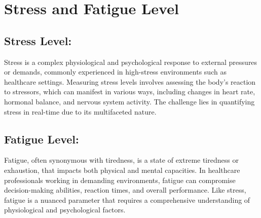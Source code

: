 \chapter{Stress and Fatigue Level}
\section{Stress Level:}
Stress is a complex physiological and psychological response to external pressures or demands, commonly experienced in high-stress environments such as healthcare settings. Measuring stress levels involves assessing the body's reaction to stressors, which can manifest in various ways, including changes in heart rate, hormonal balance, and nervous system activity. The challenge lies in quantifying stress in real-time due to its multifaceted nature.\\
\section{Fatigue Level:}
Fatigue, often synonymous with tiredness, is a state of extreme tiredness or exhaustion, that impacts both physical and mental capacities. In healthcare professionals working in demanding environments, fatigue can compromise decision-making abilities, reaction times, and overall performance. Like stress, fatigue is a nuanced parameter that requires a comprehensive understanding of physiological and psychological factors.